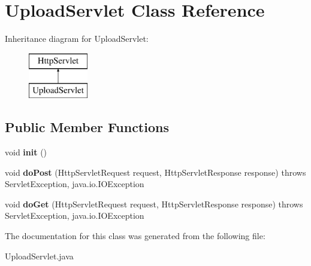 \hypertarget{class_upload_servlet}{\section{Upload\+Servlet Class Reference}
\label{class_upload_servlet}
}
Inheritance diagram for Upload\+Servlet\+:\begin{figure}[H]
\begin{center}
\leavevmode
\includegraphics[height=2.000000cm]{class_upload_servlet}
\end{center}
\end{figure}
\subsection*{Public Member Functions}
\begin{DoxyCompactItemize}
\item 
\hypertarget{class_upload_servlet_a87296b37e905dbca92c8a06352506914}{void {\bfseries init} ()}\label{class_upload_servlet_a87296b37e905dbca92c8a06352506914}

\item 
\hypertarget{class_upload_servlet_a31b1e1ae45b16e0f84596e34f23ad29c}{void {\bfseries do\+Post} (Http\+Servlet\+Request request, Http\+Servlet\+Response response)  throws Servlet\+Exception, java.\+io.\+I\+O\+Exception }\label{class_upload_servlet_a31b1e1ae45b16e0f84596e34f23ad29c}

\item 
\hypertarget{class_upload_servlet_a2b7c0174a96c9e02d17b0016b9d74230}{void {\bfseries do\+Get} (Http\+Servlet\+Request request, Http\+Servlet\+Response response)  throws Servlet\+Exception, java.\+io.\+I\+O\+Exception }\label{class_upload_servlet_a2b7c0174a96c9e02d17b0016b9d74230}

\end{DoxyCompactItemize}


The documentation for this class was generated from the following file\+:\begin{DoxyCompactItemize}
\item 
Upload\+Servlet.\+java\end{DoxyCompactItemize}
